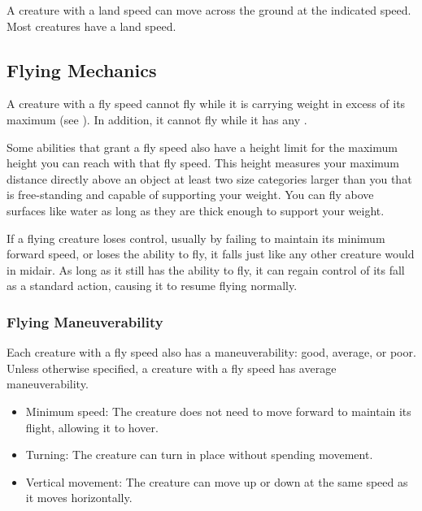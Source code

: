         A creature with a land speed can move across the ground at the indicated speed.
        Most creatures have a land speed.

    \subsection{Flying Mechanics}\label{Flying Mechanics}
        A creature with a fly speed cannot fly while it is carrying weight in excess of its maximum  (see ).
        In addition, it cannot fly while it has any .

         Some abilities that grant a fly speed also have a height limit for the maximum height you can reach with that fly speed.
        This height measures your maximum distance directly above an object at least two size categories larger than you that is free-standing and capable of supporting your weight.
        You can fly above surfaces like water as long as they are thick enough to support your weight.

         If a flying creature loses control, usually by failing to maintain its minimum forward speed, or loses the ability to fly, it falls just like any other creature would in midair. As long as it still has the ability to fly, it can regain control of its fall as a standard action, causing it to resume flying normally.

        \subsubsection{Flying Maneuverability}\label{Flying Maneuverability}
        Each creature with a fly speed also has a maneuverability: good, average, or poor.
        Unless otherwise specified, a creature with a fly speed has average maneuverability.

            \begin{itemize}
                \item Minimum speed: The creature does not need to move forward to maintain its flight, allowing it to hover.
                \item Turning: The creature can turn in place without spending movement.
                \item Vertical movement: The creature can move up or down at the same speed as it moves horizontally.
            \end{itemize}

